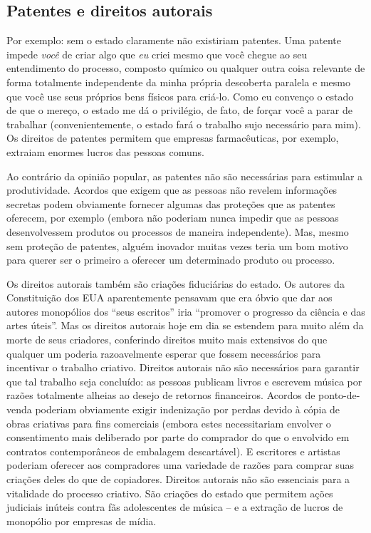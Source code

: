 \subsection*{Patentes e direitos autorais}

Por exemplo: sem o estado claramente não existiriam patentes. Uma patente impede \emph{você} de criar algo que \emph{eu} criei mesmo que você chegue ao seu entendimento do processo, composto químico ou qualquer outra coisa relevante de forma totalmente independente da minha própria descoberta paralela e mesmo que você use seus próprios bens físicos para criá-lo. Como eu convenço o estado de que o mereço, o estado me dá o privilégio, de fato, de forçar você a parar de trabalhar (convenientemente, o estado fará o trabalho sujo necessário para mim). Os direitos de patentes permitem que empresas farmacêuticas, por exemplo, extraiam enormes lucros das pessoas comuns.

Ao contrário da opinião popular, as patentes não são necessárias para estimular a produtividade. Acordos que exigem que as pessoas não revelem informações secretas podem obviamente fornecer algumas das proteções que as patentes oferecem, por exemplo (embora não poderiam nunca impedir que as pessoas desenvolvessem produtos ou processos de maneira independente). Mas, mesmo sem proteção de patentes, alguém inovador muitas vezes teria um bom motivo para querer ser o primeiro a oferecer um determinado produto ou processo.

Os direitos autorais também são criações fiduciárias do estado. Os autores da Constituição dos EUA aparentemente pensavam que era óbvio que dar aos autores monopólios dos ``seus escritos'' iria ``promover o progresso da ciência e das artes úteis''. Mas os direitos autorais hoje em dia se estendem para muito além da morte de seus criadores, conferindo direitos muito mais extensivos do que qualquer um poderia razoavelmente esperar que fossem necessários para incentivar o trabalho criativo. Direitos autorais não são necessários para garantir que tal trabalho seja concluído: as pessoas publicam livros e escrevem música por razões totalmente alheias ao desejo de retornos financeiros. Acordos de ponto-de-venda poderiam obviamente exigir indenização por perdas devido à cópia de obras criativas para fins comerciais (embora estes necessitariam envolver o consentimento mais deliberado por parte do comprador do que o envolvido em contratos contemporâneos de embalagem descartável). E escritores e artistas poderiam oferecer aos compradores uma variedade de razões para comprar suas criações deles do que de copiadores. Direitos autorais não são essenciais para a vitalidade do processo criativo. São criações do estado que permitem ações judiciais inúteis contra fãs adolescentes de música -- e a extração de lucros de monopólio por empresas de mídia.

